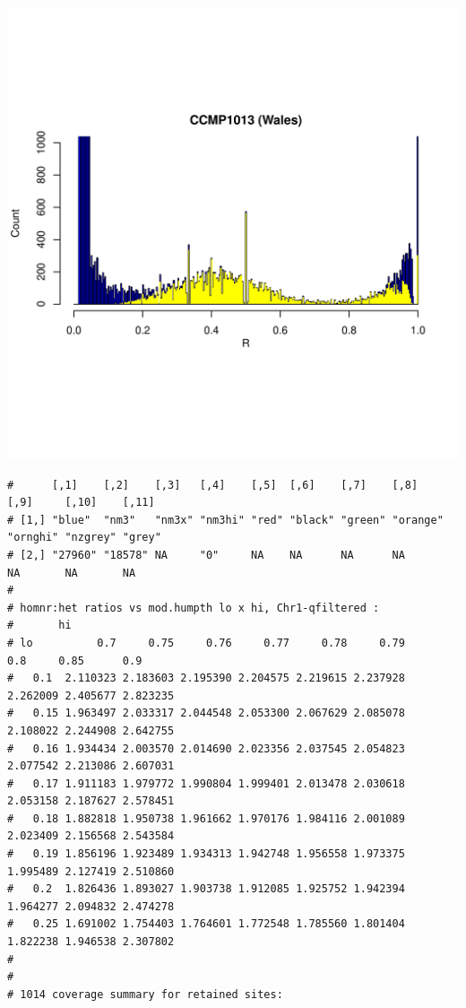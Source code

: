 \documentclass{article}\usepackage[]{graphicx}\usepackage[]{color}
\makeatletter
\def\maxwidth{ %
  \ifdim\Gin@nat@width>\linewidth
    \linewidth
  \else
    \Gin@nat@width
  \fi
}
\newenvironment{kframe}{%
 \def\at@end@of@kframe{}%
 \ifinner\ifhmode%
  \def\at@end@of@kframe{\end{minipage}}%
  \begin{minipage}{\columnwidth}%
 \fi\fi%
 \def\FrameCommand##1{\hskip\@totalleftmargin \hskip-\fboxsep
 \colorbox{shadecolor}{##1}\hskip-\fboxsep
     \hskip-\linewidth \hskip-\@totalleftmargin \hskip\columnwidth}%
 \MakeFramed {\advance\hsize-\width
   \@totalleftmargin\z@ \linewidth\hsize
   \@setminipage}}%
 {\par\unskip\endMakeFramed%
 \at@end@of@kframe}
\newenvironment{knitrout}{}{} %
\makeatother
\begin{document}
\begin{knitrout}
\includegraphics[width=\maxwidth]{FigS7-hwe-histo-figs-knitr/unnamed-chunk-10-47} 
\begin{kframe}\begin{verbatim}
#      [,1]    [,2]    [,3]   [,4]    [,5]  [,6]    [,7]    [,8]     [,9]     [,10]    [,11] 
# [1,] "blue"  "nm3"   "nm3x" "nm3hi" "red" "black" "green" "orange" "ornghi" "nzgrey" "grey"
# [2,] "27960" "18578" NA     "0"     NA    NA      NA      NA       NA       NA       NA
# 
# homnr:het ratios vs mod.humpth lo x hi, Chr1-qfiltered :
#       hi
# lo          0.7     0.75     0.76     0.77     0.78     0.79      0.8     0.85      0.9
#   0.1  2.110323 2.183603 2.195390 2.204575 2.219615 2.237928 2.262009 2.405677 2.823235
#   0.15 1.963497 2.033317 2.044548 2.053300 2.067629 2.085078 2.108022 2.244908 2.642755
#   0.16 1.934434 2.003570 2.014690 2.023356 2.037545 2.054823 2.077542 2.213086 2.607031
#   0.17 1.911183 1.979772 1.990804 1.999401 2.013478 2.030618 2.053158 2.187627 2.578451
#   0.18 1.882818 1.950738 1.961662 1.970176 1.984116 2.001089 2.023409 2.156568 2.543584
#   0.19 1.856196 1.923489 1.934313 1.942748 1.956558 1.973375 1.995489 2.127419 2.510860
#   0.2  1.826436 1.893027 1.903738 1.912085 1.925752 1.942394 1.964277 2.094832 2.474278
#   0.25 1.691002 1.754403 1.764601 1.772548 1.785560 1.801404 1.822238 1.946538 2.307802
# 
# 
# 1014 coverage summary for retained sites:

\end{verbatim}
\end{kframe}
\end{knitrout}
\end{document}
